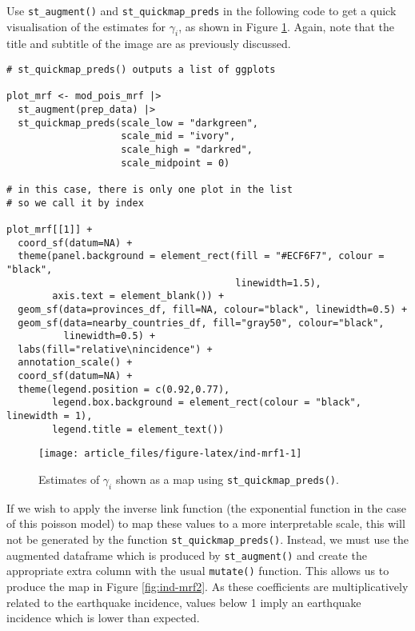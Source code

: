 Use \texttt{st\_augment()} and \texttt{st\_quickmap\_preds} in the following code to get a quick visualisation of
the estimates for \(\gamma_i\), as shown in Figure \ref{fig:ind-mrf1}. Again, note that the title and subtitle of the image are as previously discussed.



\begin{verbatim}
# st_quickmap_preds() outputs a list of ggplots

plot_mrf <- mod_pois_mrf |> 
  st_augment(prep_data) |>
  st_quickmap_preds(scale_low = "darkgreen",
                    scale_mid = "ivory", 
                    scale_high = "darkred", 
                    scale_midpoint = 0)

# in this case, there is only one plot in the list
# so we call it by index

plot_mrf[[1]] +
  coord_sf(datum=NA) +
  theme(panel.background = element_rect(fill = "#ECF6F7", colour = "black", 
                                        linewidth=1.5),
        axis.text = element_blank()) +
  geom_sf(data=provinces_df, fill=NA, colour="black", linewidth=0.5) + 
  geom_sf(data=nearby_countries_df, fill="gray50", colour="black", 
          linewidth=0.5) + 
  labs(fill="relative\nincidence") +
  annotation_scale() +
  coord_sf(datum=NA) + 
  theme(legend.position = c(0.92,0.77),
        legend.box.background = element_rect(colour = "black", linewidth = 1),
        legend.title = element_text())
\end{verbatim}

\begin{figure}

{\centering \texttt{[image: article\_files/figure-latex/ind-mrf1-1]} 

}

\caption{Estimates of \(\gamma_i\) shown as a map using \texttt{st\_quickmap\_preds()}.}\label{fig:ind-mrf1}
\end{figure}

If we wish to apply the inverse link function (the exponential function in the case of this poisson model) to map these values to a more interpretable scale, this will not be generated by the function \texttt{st\_quickmap\_preds()}. Instead, we must use the augmented dataframe which is produced by \texttt{st\_augment()} and create the appropriate extra column with the usual  \texttt{mutate()} function. This allows us to produce the map in Figure
\ref{fig:ind-mrf2}. As these coefficients are multiplicatively related
to the earthquake incidence, values below 1 imply an earthquake
incidence which is lower than expected.

